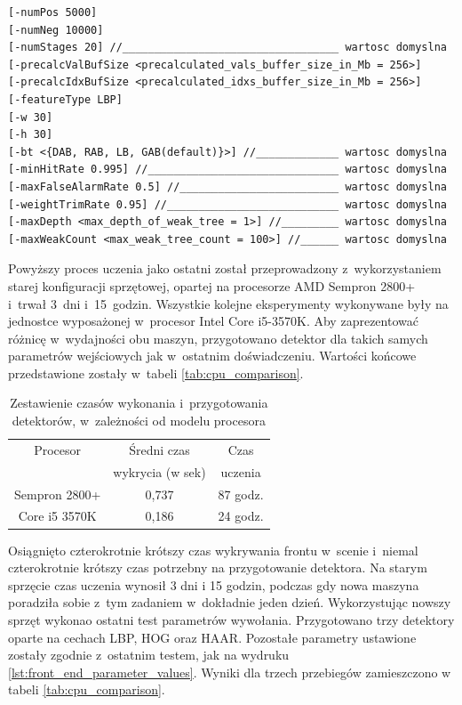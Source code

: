 \begin{lstlisting}[caption={Ostateczne parametry wywołania narzędzia opencv\_traincascade},label=lst:front_end_parameter_values]
[-numPos 5000]
[-numNeg 10000]
[-numStages 20] //__________________________________ wartosc domyslna
[-precalcValBufSize <precalculated_vals_buffer_size_in_Mb = 256>]
[-precalcIdxBufSize <precalculated_idxs_buffer_size_in_Mb = 256>]
[-featureType LBP]
[-w 30]
[-h 30]
[-bt <{DAB, RAB, LB, GAB(default)}>] //_____________ wartosc domyslna
[-minHitRate 0.995] //______________________________ wartosc domyslna
[-maxFalseAlarmRate 0.5] //_________________________ wartosc domyslna
[-weightTrimRate 0.95] //___________________________ wartosc domyslna
[-maxDepth <max_depth_of_weak_tree = 1>] //_________ wartosc domyslna
[-maxWeakCount <max_weak_tree_count = 100>] //______ wartosc domyslna
\end{lstlisting}

Powyższy proces uczenia jako ostatni został przeprowadzony z~wykorzystaniem
starej konfiguracji sprzętowej, opartej na procesorze AMD Sempron 2800+ i~trwał
3~dni i~15~godzin. Wszystkie kolejne eksperymenty wykonywane były na jednostce
wyposażonej w~procesor Intel Core i5-3570K. Aby zaprezentować różnicę
w~wydajności obu maszyn, przygotowano detektor dla takich samych parametrów
wejściowych jak w~ostatnim doświadczeniu. Wartości końcowe przedstawione zostały
w~tabeli \ref{tab:cpu_comparison}.

\begin{table}[!h]
	\centering                                                          
	\caption{Zestawienie czasów wykonania i~przygotowania detektorów,
		w~zależności od modelu procesora}
	\begin{tabular}{c|c|c}
		Procesor  & Średni czas      & Czas     \\
		& wykrycia (w sek) & uczenia  \\
		\hline
		Sempron 2800+        & 0,737  & 87 godz. \\
		Core i5 3570K        & 0,186  & 24 godz. \\
	\end{tabular} 
	\label{tab:lbp_hog_haar}
\end{table}

Osiągnięto czterokrotnie krótszy czas wykrywania frontu w~scenie i~niemal 
czterokrotnie krótszy czas potrzebny na przygotowanie detektora. Na starym 
sprzęcie czas uczenia wynosił 3 dni i 15 godzin, podczas gdy nowa maszyna
poradziła sobie z~tym zadaniem w~dokładnie jeden dzień. Wykorzystując nowszy
sprzęt wykonao ostatni test parametrów wywołania. Przygotowano trzy detektory
oparte na cechach LBP, HOG oraz HAAR. Pozostałe parametry ustawione zostały
zgodnie z~ostatnim testem, jak na wydruku \ref{lst:front_end_parameter_values}.
Wyniki dla trzech przebiegów zamieszczono w tabeli \ref{tab:cpu_comparison}.

